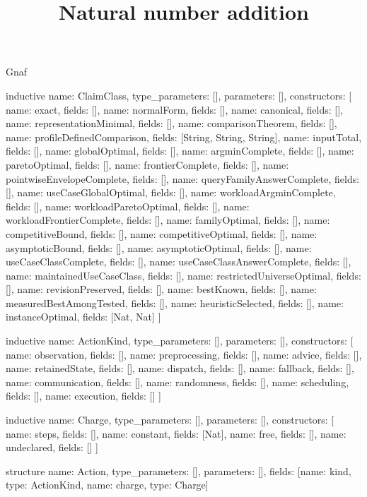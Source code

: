 \begin{lexlean}{Gnaf}
\title{Natural number addition}
\begin{semanticmodule}
inductive{
  name: ClaimClass,
  type_parameters: [],
  parameters: [],
  constructors: [
    {name: exact, fields: []},
    {name: normalForm, fields: []},
    {name: canonical, fields: []},
    {name: representationMinimal, fields: []},
    {name: comparisonTheorem, fields: []},
    {name: profileDefinedComparison, fields: [String, String, String]},
    {name: inputTotal, fields: []},
    {name: globalOptimal, fields: []},
    {name: argminComplete, fields: []},
    {name: paretoOptimal, fields: []},
    {name: frontierComplete, fields: []},
    {name: pointwiseEnvelopeComplete, fields: []},
    {name: queryFamilyAnswerComplete, fields: []},
    {name: useCaseGlobalOptimal, fields: []},
    {name: workloadArgminComplete, fields: []},
    {name: workloadParetoOptimal, fields: []},
    {name: workloadFrontierComplete, fields: []},
    {name: familyOptimal, fields: []},
    {name: competitiveBound, fields: []},
    {name: competitiveOptimal, fields: []},
    {name: asymptoticBound, fields: []},
    {name: asymptoticOptimal, fields: []},
    {name: useCaseClassComplete, fields: []},
    {name: useCaseClassAnswerComplete, fields: []},
    {name: maintainedUseCaseClass, fields: []},
    {name: restrictedUniverseOptimal, fields: []},
    {name: revisionPreserved, fields: []},
    {name: bestKnown, fields: []},
    {name: measuredBestAmongTested, fields: []},
    {name: heuristicSelected, fields: []},
    {name: instanceOptimal, fields: [Nat, Nat]}
  ]
}

inductive{
  name: ActionKind,
  type_parameters: [],
  parameters: [],
  constructors: [
    {name: observation, fields: []},
    {name: preprocessing, fields: []},
    {name: advice, fields: []},
    {name: retainedState, fields: []},
    {name: dispatch, fields: []},
    {name: fallback, fields: []},
    {name: communication, fields: []},
    {name: randomness, fields: []},
    {name: scheduling, fields: []},
    {name: execution, fields: []}
  ]
}

inductive{
  name: Charge,
  type_parameters: [],
  parameters: [],
  constructors: [
    {name: steps, fields: []},
    {name: constant, fields: [Nat]},
    {name: free, fields: []},
    {name: undeclared, fields: []}
  ]
}

structure{
  name: Action,
  type_parameters: [],
  parameters: [],
  fields: [{name: kind, type: ActionKind}, {name: charge, type: Charge}]
}


\end{semanticmodule}
\end{lexlean}
